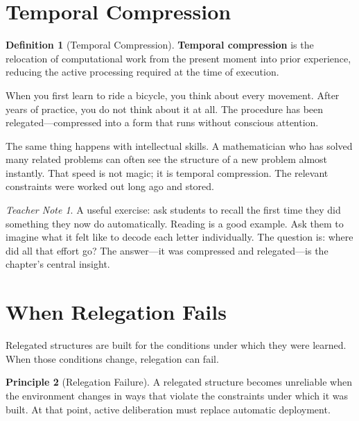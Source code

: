 \documentclass[11pt]{book}
\theoremstyle{definition}
\newtheorem{definition}{Definition}[chapter]
\newtheorem{principle}[definition]{Principle}
\theoremstyle{remark}
\newtheorem{teachernote}{Teacher Note}[chapter]
\begin{document}
\section{Temporal Compression}

\begin{definition}[Temporal Compression]
\textbf{Temporal compression} is the relocation of computational work from
the present moment into prior experience, reducing the active processing
required at the time of execution.
\end{definition}

When you first learn to ride a bicycle, you think about every movement.
After years of practice, you do not think about it at all. The procedure
has been relegated---compressed into a form that runs without conscious
attention.

The same thing happens with intellectual skills. A mathematician who has
solved many related problems can often see the structure of a new problem
almost instantly. That speed is not magic; it is temporal compression.
The relevant constraints were worked out long ago and stored.

\begin{teachernote}
A useful exercise: ask students to recall the first time they did
something they now do automatically. Reading is a good example.
Ask them to imagine what it felt like to decode each letter individually.
The question is: where did all that effort go? The answer---it was
compressed and relegated---is the chapter's central insight.
\end{teachernote}

\section{When Relegation Fails}

Relegated structures are built for the conditions under which they were
learned. When those conditions change, relegation can fail.

\begin{principle}[Relegation Failure]
A relegated structure becomes unreliable when the environment changes in
ways that violate the constraints under which it was built. At that
point, active deliberation must replace automatic deployment.
\end{principle}
\end{document}
